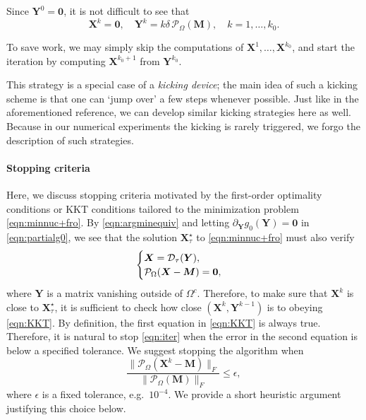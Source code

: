 \documentclass[conference,onecolumn,12pt]{IEEEtran}
\newcommand{\mtx}[1]{\bm{#1}}
\numberwithin{equation}{section}
\numberwithin{figure}{section}
\numberwithin{table}{section}
\theoremstyle{definition}
\begin{document}
Since $\mtx{Y}^0=\mtx{0}$, it is not difficult to see that
\[
\mtx{X}^k = \mtx{0}, \quad \mtx{Y}^k= k\delta\,
\mathcal{P}_{\Omega}(\mtx{M}), \quad k = 1, \ldots, k_0.
\]

To save work, we may simply skip the computations of
$\mtx{X}^1,\ldots,\mtx{X}^{k_0}$, and start the iteration by computing
$\mtx{X}^{k_0+1}$ from $\mtx{Y}^{k_0}$.

This strategy is a special case of a {\em kicking device}; the main idea of such a kicking scheme is that
one can `jump over' a few steps whenever possible. Just like in the
aforementioned reference, we can develop similar kicking strategies
here as well.  Because in our numerical experiments the kicking is
rarely triggered, we forgo the description of such strategies.


  \paragraph{Stopping criteria}

  Here, we discuss stopping criteria  motivated by the first-order optimality conditions or KKT
  conditions tailored to the minimization problem
  \eqref{eqn:minnuc+fro}. By \eqref{eqn:argminequiv} and letting
  $\partial_{\mtx{Y}} g_0(\mtx{Y})=\mtx{0}$ in \eqref{eqn:partialg0}, we
  see that the solution $\mtx{X}^\star_{\tau}$ to \eqref{eqn:minnuc+fro}
  must also verify
  \begin{equation}\label{eqn:KKT}
  \begin{cases}
  \mtx{X}=\mathcal{D}_{\tau}(\mtx{Y}),\cr
  \mathcal{P}_{\Omega}(\mtx{X}-\mtx{M})=\mtx{0},
  \end{cases}
  \end{equation}
  where $\mtx{Y}$ is a matrix vanishing outside of $\Omega^c$.
  Therefore, to make sure that $\mtx{X}^k$ is close to
  $\mtx{X}^{\star}_\tau$, it is sufficient to check how close
  $(\mtx{X}^k,\mtx{Y}^{k-1})$ is to obeying \eqref{eqn:KKT}. By
  definition, the first equation in \eqref{eqn:KKT} is always
  true. Therefore, it is natural to stop \eqref{eqn:iter} when the error
  in the second equation is below a specified tolerance. We suggest
  stopping the algorithm when
  \begin{equation}\label{eqn:stop0}
  \frac{\|\mathcal{P}_{\Omega}(\mtx{X}^k-\mtx{M})\|_F}{\|\mathcal{P}_{\Omega}(\mtx{M})\|_F}\leq\epsilon,
  \end{equation}
  where $\epsilon$ is a fixed tolerance, e.g.~$10^{-4}$. We provide a
  short heuristic argument justifying this choice below.
\end{document}
